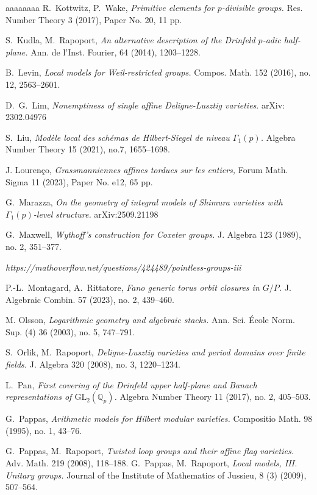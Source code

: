 \documentclass[reqno, 10pt]{amsart}
\newcommand{\BQ}{\ensuremath{\mathbb {Q}}\xspace}
\newcommand{\GL}{\mathrm{GL}}
\theoremstyle{definition}
\numberwithin{equation}{subsection}
\numberwithin{subsubsection}{subsection}
\begin{document}
\begin{thebibliography}{aaaaaaaa}
  R.~Kottwitz, P.~Wake, \emph{Primitive elements for $p$-divisible groups.} 
 Res. Number Theory 3 (2017), Paper No. 20, 11 pp.

  S.~Kudla, M.~Rapoport, \emph{ An alternative description of the Drinfeld $p$-adic half-plane.} Ann. de l'Inst. Fourier, 64  (2014), 1203--1228.

  B.~Levin, \textit{Local models for Weil-restricted groups.}
Compos. Math. 152 (2016), no. 12, 2563--2601.

D.~G.~Lim, \textit{Nonemptiness of single affine Deligne-Lusztig varieties}. arXiv: 2302.04976 

 S.~Liu,  
\textit{Modèle local des schémas de Hilbert-Siegel de niveau $\Gamma_1(p)$. }
Algebra Number Theory 15 (2021), no.7, 1655–1698.

 J. Louren\c co, \emph{Grassmanniennes affines tordues 
sur les entiers,}
Forum Math. Sigma 11 (2023), Paper No. e12, 65 pp.

 G.~Marazza, 
\emph{On the geometry of integral models of Shimura varieties with $\Gamma_1(p)$-level structure.} arXiv:2509.21198
 
 G.~Maxwell, \emph{Wythoff's construction for Coxeter groups.}
J. Algebra 123 (1989), no. 2, 351--377.

  \textit{https://mathoverflow.net/questions/424489/pointless-groups-iii}

 P.-L.~Montagard,  A.~Rittatore, \emph{Fano generic torus orbit closures in  $G/P$.}
J. Algebraic Combin. 57 (2023), no. 2, 439--460.

 M. Olsson, \emph{Logarithmic geometry and algebraic stacks.}
Ann. Sci. \'Ecole Norm. Sup. (4) 36 (2003), no. 5, 747--791.

 S.~Orlik, M.~Rapoport,
\textit{Deligne-Lusztig varieties and period domains over finite fields.}
J. Algebra 320 (2008), no. 3, 1220--1234.

 L.~Pan, \emph{First covering of the Drinfeld upper half-plane and Banach representations of $\GL_2(\BQ_p)$.}
Algebra Number Theory 11 (2017), no. 2, 405--503.

  G.~Pappas, \emph{Arithmetic models for Hilbert modular varieties.}
Compositio Math. 98 (1995), no. 1, 43--76.

 G.~Pappas, M.~Rapoport, \textit{ Twisted loop groups and their affine flag varieties.}
Adv. Math. 219 (2008), 118--188.
  G.~Pappas, M.~Rapoport, \textit{Local models, III. Unitary groups.} Journal of the Institute of Mathematics of Jussieu, 8 (3) (2009), 507--564.
 

\end{thebibliography}
\end{document}
